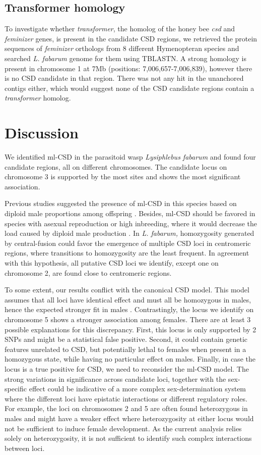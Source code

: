 \documentclass[11pt,a4paper]{report}
\begin{document}
\subsection{Transformer homology}
To investigate whether \textit{transformer}, the homolog of the honey bee \textit{csd} and \textit{feminizer} genes, is present in the candidate CSD regions, we retrieved the protein sequences of \textit{feminizer} orthologs from 8 different Hymenopteran species and searched \textit{L. fabarum} genome for them using TBLASTN. A strong homology is present in chromosome 1 at 7Mb (positions: 7,006,657-7,006,839), however there is no CSD candidate in that region. There was not any hit in the unanchored contigs either, which would suggest none of the CSD candidate regions contain a \textit{transformer} homolog.

\section{Discussion}
We identified ml-CSD in the parasitoid wasp \textit{Lysiphlebus fabarum} and found four candidate regions, all on different chromosomes. The candidate locus on chromosome 3 is supported by the most sites and shows the most significant association. 

Previous studies suggested the presence of ml-CSD in this species based on diploid male proportions among offspring \citep{Engelstadter2011}. Besides, ml-CSD should be favored in species with asexual reproduction or high inbreeding, where it would decrease the load caused by diploid male production \citep{Vorburger2014}. In \textit{L. fabarum,} homozygosity generated by central-fusion could favor the emergence of multiple CSD loci in centromeric regions, where transitions to homozygosity are the least frequent. In agreement with this hypothesis, all putative CSD loci we identify, except one on chromosome 2,  are found close to centromeric regions.

To some extent, our results conflict with the canonical CSD model. This model assumes that all loci have identical effect and must all be homozygous in males, hence the expected stronger fit in males \citep{Crozier1971}. Contrastingly, the locus we identify on chromosome 5 shows a stronger association among females. There are at least 3 possible explanations for this discrepancy. First, this locus is only supported by 2 SNPs and might be a statistical false positive. Second, it could contain genetic features unrelated to CSD, but potentially lethal to females when present in a homozygous state, while having no particular effect on males. Finally, in case the locus is a true positive for CSD, we need to reconsider the ml-CSD model. The strong variations in significance across candidate loci, together with the sex-specific effect could be indicative of a more complex sex-determination system where the different loci have epistatic interactions or different regulatory roles. For example, the loci on chromosomes 2 and 5 are often found heterozygous in males and might have a weaker effect where heterozygosity at either locus would not be sufficient to induce female development. As the current analysis relies solely on heterozygosity, it is not sufficient to identify such complex interactions between loci. 
\end{document}
